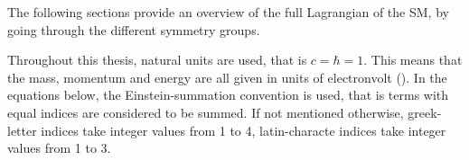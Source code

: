 The following sections provide an overview of the full Lagrangian of the SM, by going through the different symmetry groups. 

Throughout this thesis, natural units are used, that is $c = \hbar = 1$. This means that the mass, momentum and energy are all given in units of electronvolt (\eV).
In the equations below, the Einstein-summation convention is used, that is terms with equal indices are considered to be summed. If not mentioned otherwise, greek-letter indices take integer values from 1 to 4, latin-characte indices take integer values from 1 to 3.











